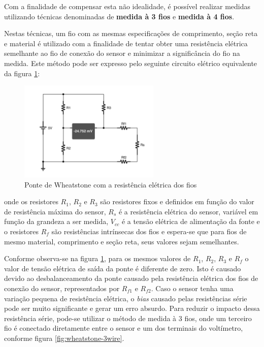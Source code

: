 \documentclass[12pt,a4paper]{instrumentacao}
\begin{document}
Com a finalidade de compensar esta não idealidade, é possível realizar medidas utilizando técnicas denominadas de \textbf{medida à 3 fios} e \textbf{medida à 4 fios}.

Nestas técnicas, um fio com as mesmas especificações de comprimento, seção reta e material é utilizado com a finalidade de tentar obter uma resistência elétrica semelhante ao fio de conexão do sensor e minimizar a significância do fio na medida. Este método pode ser expresso pelo seguinte circuito elétrico equivalente da figura \ref{fig:wheatstone-wire-model}:

\begin{figure}[H]
\centering
\includegraphics[width=0.6\textwidth]{Wheatstone-Bridge-WiresModel.pdf}
\caption{Ponte de Wheatstone com a resistência elétrica dos fios}
\label{fig:wheatstone-wire-model}
\end{figure}

onde os resistores $R_1$, $R_2$ e $R_3$ são resistores fixos e definidos em função do valor de resistência máxima do sensor, $R_s$ é a resistência elétrica do sensor, variável em função da grandeza a ser medida, $V_{cc}$ é a tensão elétrica de alimentação da fonte e o resistores $R_f$ são resistências intrínsecas dos fios e espera-se que para fios de mesmo material, comprimento e seção reta, seus valores sejam semelhantes.

Conforme observa-se na figura \ref{fig:wheatstone-wire-model}, para os mesmos valores de $R_1$, $R_2$, $R_3$ e $R_f$ o valor de tensão elétrica de saída da ponte é diferente de zero. Isto é causado devido ao desbalanceamento da ponte causado pela resistência elétrica dos fios de conexão do sensor, representados por $R_{f1}$ e $R_{f2}$. Caso o sensor tenha uma variação pequena de resistência elétrica, o \textit{bias} causado pelas resistências série pode ser muito significante e gerar um erro absurdo. Para reduzir o impacto dessa resistência série, pode-se utilizar o método de medida à 3 fios, onde um terceiro fio é conectado diretamente entre o sensor e um dos terminais do voltímetro, conforme figura \ref{fig:wheatstone-3wire}.
\end{document}
